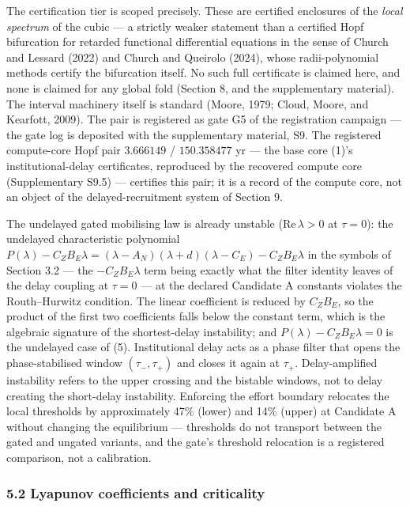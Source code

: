 \documentclass[11pt]{article}
\begin{document}
The certification tier is scoped precisely. These are certified
enclosures of the \emph{local spectrum} of the cubic --- a strictly
weaker statement than a certified Hopf bifurcation for retarded
functional differential equations in the sense of Church and Lessard
(2022) and Church and Queirolo (2024), whose radii-polynomial methods
certify the bifurcation itself. No such full certificate is claimed
here, and none is claimed for any global fold (Section 8, and the
supplementary material). The interval machinery itself is standard
(Moore, 1979; Cloud, Moore, and Kearfott, 2009). The pair is registered
as gate G5 of the registration campaign --- the gate log is deposited
with the supplementary material, S9. The registered compute-core Hopf
pair \(3.666149\) / \(150.358477\) yr --- the base core (1)'s
institutional-delay certificates, reproduced by the recovered compute
core (Supplementary S9.5) --- certifies this pair; it is a record of the
compute core, not an object of the delayed-recruitment system of Section
9.

The undelayed gated mobilising law is already unstable
(\(\mathrm{Re}\,\lambda > 0\) at \(\tau = 0\)): the undelayed
characteristic polynomial
\(P(\lambda) - C_Z B_E\lambda = (\lambda - A_N)(\lambda + d)(\lambda - C_E) - C_Z B_E\lambda\)
in the symbols of Section 3.2 --- the \(-C_Z B_E\lambda\) term being
exactly what the filter identity leaves of the delay coupling at
\(\tau = 0\) --- at the declared Candidate A constants violates the
Routh--Hurwitz condition. The linear coefficient is reduced by
\(C_Z B_E\), so the product of the first two coefficients falls below
the constant term, which is the algebraic signature of the
shortest-delay instability; and \(P(\lambda) - C_Z B_E\lambda = 0\) is
the undelayed case of (5). Institutional delay acts as a phase filter
that opens the phase-stabilised window \((\tau_-, \tau_+)\) and closes
it again at \(\tau_+\). Delay-amplified instability refers to the upper
crossing and the bistable windows, not to delay creating the short-delay
instability. Enforcing the effort boundary relocates the local
thresholds by approximately 47\% (lower) and 14\% (upper) at Candidate A
without changing the equilibrium --- thresholds do not transport between
the gated and ungated variants, and the gate's threshold relocation is a
registered comparison, not a calibration.

\subsubsection{5.2 Lyapunov coefficients and
criticality}\label{lyapunov-coefficients-and-criticality}
\end{document}
